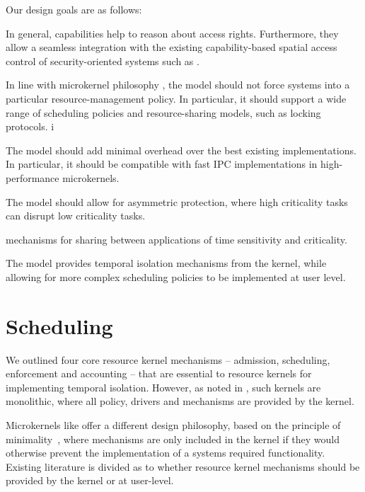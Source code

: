 Our design goals are as follows:
\begin{description}\sloppy
    \item[Capability-controlled enforcement of time limits:] In general, capabilities
      help to reason about access rights. Furthermore, they allow a
        seamless integration with the existing capability-based spatial
          access control of security-oriented systems such as \selfour.
    \item[Policy freedom:] In line with microkernel philosophy
        \citep{Heiser_Elphinstone_16}, the model should not force systems
        into a particular resource-management policy. In particular, it
        should support a wide range of scheduling policies and
        resource-sharing models, such as locking protocols.
i%
    \item[Efficient:] The model should add minimal overhead over the best
                      existing implementations. In particular, it should be compatible
                        with fast IPC implementations in high-performance microkernels.

    \item[Asymmetric Protection:] The model should allow for asymmetric protection, where high
        criticality tasks can disrupt low criticality tasks.
    \item[Safe resource sharing:] mechanisms for sharing between applications of time sensitivity
        and criticality.
\end{description}

The model  provides temporal isolation mechanisms from the kernel, while allowing for more complex
scheduling policies to be implemented at user level.

\section{Scheduling}

We outlined four core resource kernel mechanisms -- admission, scheduling, enforcement and
accounting -- that are essential to resource kernels for implementing temporal isolation.  However,
as noted in , such kernels are monolithic, where all policy, drivers and
mechanisms are provided by the kernel.

Microkernels like \selfour offer a different design philosophy, based on the principle of
minimality~\citep{Liedtke_95}, where mechanisms are only included in the kernel if they would
otherwise prevent the implementation of a systems required functionality.  Existing literature is
divided as to whether resource kernel mechanisms should be provided by the kernel or at user-level.

